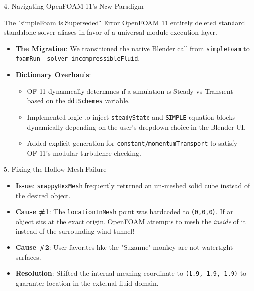 \documentclass[dvipsnames,mathserif]{beamer}
\begin{document}
\begin{frame}{4. Navigating OpenFOAM 11's New Paradigm}
    \begin{alertblock}{The "simpleFoam is Superseded" Error}
        OpenFOAM 11 entirely deleted standard standalone solver aliases in favor of a universal module execution layer.
    \end{alertblock}
    \begin{itemize}
        \item \textbf{The Migration}: We transitioned the native Blender call from \texttt{simpleFoam} to \texttt{foamRun -solver incompressibleFluid}.
        \item \textbf{Dictionary Overhauls}: 
        \begin{itemize}
            \item OF-11 dynamically determines if a simulation is Steady vs Transient based on the \texttt{ddtSchemes} variable.
            \item Implemented logic to inject \texttt{steadyState} and \texttt{SIMPLE} equation blocks dynamically depending on the user's dropdown choice in the Blender UI.
            \item Added explicit generation for \texttt{constant/momentumTransport} to satisfy OF-11's modular turbulence checking.
        \end{itemize}
    \end{itemize}
\end{frame}

\begin{frame}{5. Fixing the Hollow Mesh Failure}
    \begin{itemize}
        \item \textbf{Issue}: \texttt{snappyHexMesh} frequently returned an un-meshed solid cube instead of the desired object.
        \item \textbf{Cause \#1}: The \texttt{locationInMesh} point was hardcoded to \texttt{(0,0,0)}. If an object sits at the exact origin, OpenFOAM attempts to mesh the \textit{inside} of it instead of the surrounding wind tunnel!
        \item \textbf{Cause \#2}: User-favorites like the "Suzanne" monkey are not watertight surfaces.
        \item \textbf{Resolution}: Shifted the internal meshing coordinate to \texttt{(1.9, 1.9, 1.9)} to guarantee location in the external fluid domain.
    \end{itemize}
\end{frame}
\end{document}
